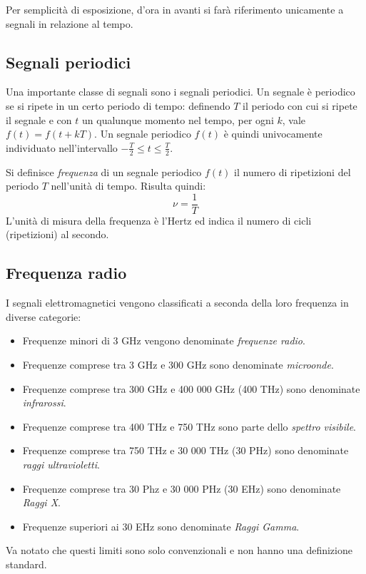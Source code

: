 Per semplicit\`a di esposizione, d'ora in avanti si far\`a riferimento
unicamente a segnali in relazione al tempo.

\subsection{Segnali periodici}
Una importante classe di segnali sono i segnali periodici. Un segnale \`e
periodico se si ripete in un certo periodo di tempo: definendo $T$ il periodo con
cui si ripete il segnale e con $t$ un qualunque momento nel tempo, per ogni $k$,
vale $f(t) = f(t + kT)$. Un segnale periodico $f(t)$ \`e quindi univocamente
individuato nell'intervallo $-\frac{T}{2} \le t \le \frac{T}{2}$.

Si definisce  \emph{frequenza} di un segnale periodico $f(t)$ il numero di
ripetizioni del periodo $T$ nell'unit\`a di tempo. Risulta quindi:
\[
\nu = \frac{1}{T}
\]
L'unit\`a di misura della frequenza \`e l'Hertz ed indica il numero di cicli
(ripetizioni) al secondo.

\subsection{Frequenza radio}
I segnali elettromagnetici vengono classificati a seconda della loro frequenza
in diverse categorie:
\begin{itemize} 
	\item Frequenze minori di 3 GHz vengono denominate \emph{frequenze radio}.
	\item Frequenze comprese tra 3 GHz e 300 GHz sono denominate
		\emph{microonde}.
	\item Frequenze comprese tra 300 GHz e 400 000 GHz (400 THz) sono denominate
		\emph{infrarossi}.
	\item Frequenze comprese tra 400 THz e 750 THz sono parte dello
		\emph{spettro visibile}.
	\item Frequenze comprese tra 750 THz e 30 000 THz (30 PHz) sono denominate
		\emph{raggi ultravioletti}.
	\item Frequenze comprese tra 30 Phz e 30 000 PHz (30 EHz) sono denominate
		\emph{Raggi X}.
	\item Frequenze superiori ai 30 EHz sono denominate \emph{Raggi Gamma}.
\end{itemize}
Va notato che questi limiti sono solo convenzionali e non hanno una definizione
standard.


